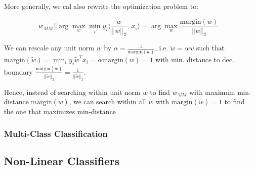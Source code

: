 \documentclass[a4paper]{extarticle}
\begin{document}
More generally, we cal also rewrite the optimization problem to:

\[
    w_{MM} || \arg \max_w \min_i y_i \langle \frac{w}{||w||_2}, \, x_i \rangle = \arg \max_w \frac{\text{margin}(w)}{||w||_2}
\]

We can rescale any unit norm \(w\) by \(\alpha = \frac{1}{\text{margin}(w)}\), i.e. \(\tilde{w} = \alpha w\) such that \(\text{margin}(\tilde{w}) = \min_i y_i \tilde{w}^Tx_i = \alpha \text{margin}(w) = 1\) with min. distance to dec. boundary \(\frac{\text{margin}(\tilde{w})}{||\tilde{w}||_2} = \frac{1}{||\tilde{w}||_2}\).

Hence, instead of searching within unit norm \(w\) to find \(w_{MM}\) with maximum min-distance \(\text{margin}(w)\), we can search within all \(\tilde{w}\) with \(\text{margin}(\tilde{w}) = 1\) to find the one that maximizes min-distance \(\)


\subsubsection{Multi-Class Classification}

\subsection{Non-Linear Classifiers}
\end{document}
